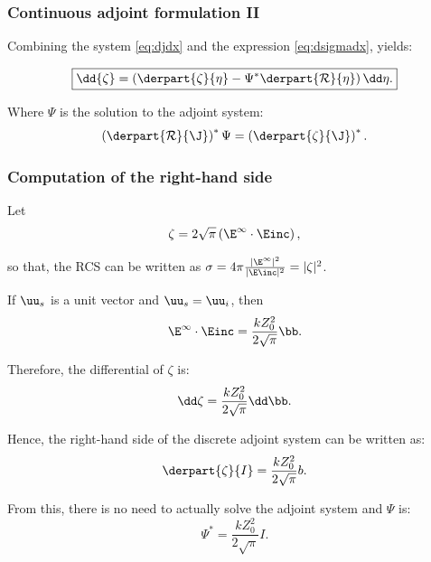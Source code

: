 \documentclass[beamer]{standalone}
\begin{document}
\begin{frame}
    \frametitle{Continuous adjoint formulation II}
    Combining the system \eqref{eq:djdx} and the expression \eqref{eq:dsigmadx}, yields:

    \begin{equation}
        \boxed{
        \dd{\zeta} = \left(\derpart{\zeta}{\eta} - \Psi^*\derpart{\mathcal R}{\eta}\right)\dd\eta.
        }
        \label{eq:dsigmadx-adj}
    \end{equation}

    Where $\Psi$ is the solution to the adjoint system: 
    \begin{equation}
        \left(\derpart{\mathcal R}{\J}\right)^* \Psi = \left(\derpart{\zeta}{\J}\right)^*.
        \label{eq:adjoint-cont}
    \end{equation}
\end{frame}


\begin{frame}
    \label{fra:smembre}
    \frametitle{Computation of the right-hand side}

    Let %
    \begin{equation}
        \zeta = 2\sqrt{\pi}\left(\E^\infty\cdot\Einc\right),
    \end{equation}

    so that, the RCS can be written as $\sigma = 4\pi\frac{|\E^\infty|^2}{|\E\inc|^2} = |\zeta|^2$.

    \pause
    If $\uu_s$ is a unit vector and $\uu_s = \uu_i$, then
    \begin{equation}
        \E^\infty\cdot\Einc = \frac{kZ_0^2}{2\sqrt{\pi}}\bb.
    \end{equation}

    \pause
    Therefore, the differential of $\zeta$ is:
    \begin{equation}
        \dd\zeta = \frac{kZ_0^2}{2\sqrt{\pi}}\dd\bb.
    \end{equation}

    \pause
    Hence, the right-hand side of the discrete adjoint system can be written as:
    \begin{equation}
        \derpart{\zeta}{I} = \frac{kZ_0^2}{2\sqrt{\pi}}b.
    \end{equation}

    \pause
    From this, there is no need to actually solve the adjoint system and $\Psi$ is:
    \begin{equation}
        \Psi^* = \frac{kZ_0^2}{2\sqrt{\pi}}I.
    \end{equation}

\end{frame}
\end{document}

